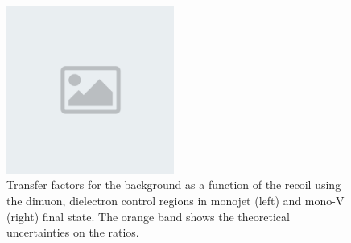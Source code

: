 \begin{figure}[htbp]
  \includegraphics[width=0.49\textwidth]{placeholder.png}
  \caption{Transfer factors for the \Zvv background as a function of the recoil using the dimuon, dielectron control regions in monojet (left) and mono-V (right) final state. The orange band shows the theoretical uncertainties on the ratios.}\label{fig:ZvvZSF}
\end{figure}


